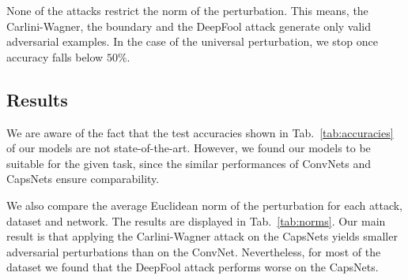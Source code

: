 \documentclass{article}
\begin{document}
None of the attacks restrict the norm of the perturbation. This means, the Carlini-Wagner, the boundary and the DeepFool attack generate only valid adversarial examples. In the case of the universal perturbation, we stop once accuracy falls below $50\%$.



\subsection{Results}

We are aware of the fact that the test accuracies shown in Tab.~\ref{tab:accuracies} of our models are not state-of-the-art. However, we found our models to be suitable for the given task, since the similar performances of ConvNets and CapsNets ensure comparability. 
\begin{table}[h]
	\caption{Test accuracies achieved by our networks.}
	\vskip 0.15in
	\centering{}
	\label{tab:accuracies}
\end{table}


We also compare the average Euclidean norm of the perturbation for each attack, dataset and network. The results are displayed in Tab.~\ref{tab:norms}. Our main result is that applying the Carlini-Wagner attack on the CapsNets yields smaller adversarial perturbations than on the ConvNet. Nevertheless, for most of the dataset we found that the DeepFool attack performs worse on the CapsNets.
\end{document}
